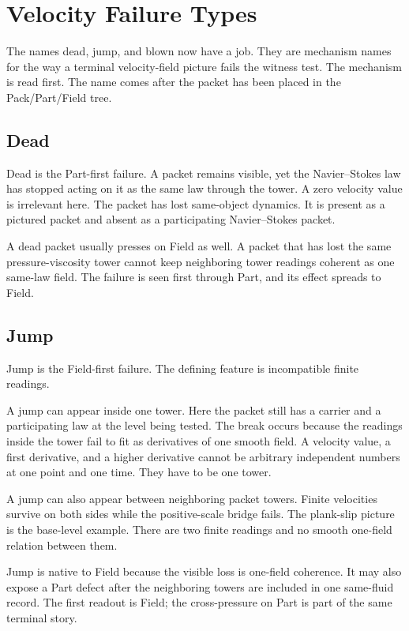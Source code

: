 \documentclass[11pt]{article}
\begin{document}
\section{Velocity Failure Types}

The names dead, jump, and blown now have a job.
They are mechanism names for the way a terminal velocity-field picture fails the witness test.
The mechanism is read first.
The name comes after the packet has been placed in the Pack/Part/Field tree.

\subsection{Dead}

Dead is the Part-first failure.
A packet remains visible, yet the Navier--Stokes law has stopped acting on it as the same law through the tower.
A zero velocity value is irrelevant here.
The packet has lost same-object dynamics.
It is present as a pictured packet and absent as a participating Navier--Stokes packet.

A dead packet usually presses on Field as well.
A packet that has lost the same pressure-viscosity tower cannot keep neighboring tower readings coherent as one same-law field.
The failure is seen first through Part, and its effect spreads to Field.

\subsection{Jump}

Jump is the Field-first failure.
The defining feature is incompatible finite readings.

A jump can appear inside one tower.
Here the packet still has a carrier and a participating law at the level being tested.
The break occurs because the readings inside the tower fail to fit as derivatives of one smooth field.
A velocity value, a first derivative, and a higher derivative cannot be arbitrary independent numbers at one point and one time.
They have to be one tower.

A jump can also appear between neighboring packet towers.
Finite velocities survive on both sides while the positive-scale bridge fails.
The plank-slip picture is the base-level example.
There are two finite readings and no smooth one-field relation between them.

Jump is native to Field because the visible loss is one-field coherence.
It may also expose a Part defect after the neighboring towers are included in one same-fluid record.
The first readout is Field; the cross-pressure on Part is part of the same terminal story.
\end{document}
